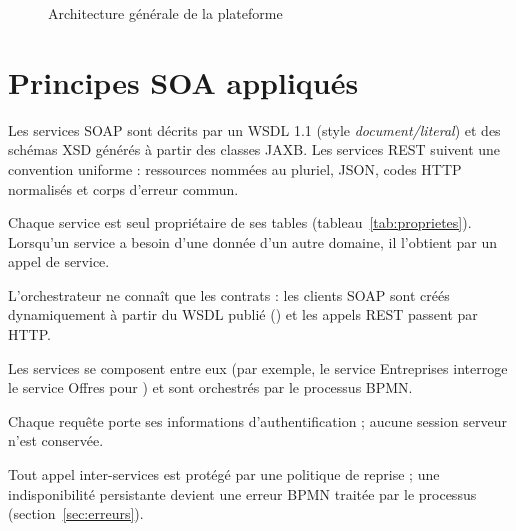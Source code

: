 \begin{figure}[htbp]
\caption{Architecture générale de la plateforme}\label{fig:architecture}
\end{figure}

\section{Principes SOA appliqués}
\begin{description}[style=nextline]
  \item[Contrat standardisé] Les services SOAP sont décrits par un WSDL 1.1 (style \emph{document/literal}) et des
        schémas XSD générés à partir des classes JAXB. Les services REST suivent une convention uniforme : ressources
        nommées au pluriel, JSON, codes HTTP normalisés et corps d'erreur commun.
  \item[Autonomie et propriété des données] Chaque service est seul propriétaire de ses tables (tableau~\ref{tab:proprietes}).
        Lorsqu'un service a besoin d'une donnée d'un autre domaine, il l'obtient par un appel de service.
  \item[Couplage faible] L'orchestrateur ne connaît que les contrats : les clients SOAP sont créés dynamiquement à partir
        du WSDL publié () et les appels REST passent par HTTP.
  \item[Composition] Les services se composent entre eux (par exemple, le service Entreprises interroge le service Offres
        pour ) et sont orchestrés par le processus BPMN.
  \item[Sans état] Chaque requête porte ses informations d'authentification ; aucune session serveur n'est conservée.
  \item[Résilience] Tout appel inter-services est protégé par une politique de reprise ; une indisponibilité persistante
        devient une erreur BPMN traitée par le processus (section~\ref{sec:erreurs}).
\end{description}

